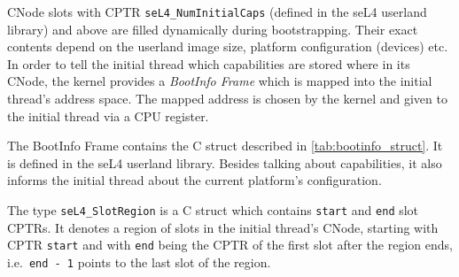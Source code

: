 CNode slots with CPTR \texttt{seL4\_NumInitialCaps} (defined in the seL4
userland library) and above are filled dynamically during
bootstrapping. Their exact contents depend on the userland image size,
platform configuration (devices) etc. In order to tell the initial thread
which capabilities are stored where in its CNode, the kernel provides
a \emph{BootInfo Frame} which is mapped into the initial thread's address
space. The mapped address is chosen by the kernel and given to the initial
thread via a CPU register.

The BootInfo Frame contains the C struct described in
\autoref{tab:bootinfo_struct}.
It is defined in the seL4 userland library. Besides talking about
capabilities, it also informs the initial thread about
the current platform's configuration.

The type \texttt{seL4\_SlotRegion} is a C struct
which contains \texttt{start} and \texttt{end} slot CPTRs. It denotes a region
of slots in the initial thread's CNode, starting with CPTR \texttt{start} and with
\texttt{end} being the CPTR of the first slot after the region ends, i.e.\
\texttt{end - 1} points to the last slot of the region.

